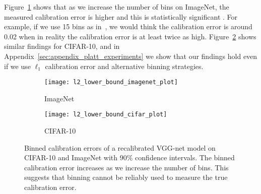 Figure~\ref{fig:imagenet_lower_bound} shows that as we increase the number of bins on ImageNet, the measured calibration error is higher and this is statistically significant . For example, if we use 15 bins as in~\cite{guo2017calibration}, we would think the calibration error is around 0.02 when in reality the calibration error is at least twice as high. Figure~\ref{fig:cifar_10_lower_bound} shows similar findings for CIFAR-10, and in Appendix~\ref{sec:appendix_platt_experiments} we show that our findings hold even if we use $\ell_1$ calibration error and alternative binning strategies.

\begin{figure}
     \centering
     \begin{subfigure}[b]{0.4\textwidth}
         \centering
         \texttt{[image: l2\_lower\_bound\_imagenet\_plot]}
         \caption{ImageNet}
         \label{fig:imagenet_lower_bound}
     \end{subfigure}
     \hfill
     \begin{subfigure}[b]{0.4\textwidth}
         \centering
         \texttt{[image: l2\_lower\_bound\_cifar\_plot]}
         \caption{CIFAR-10}
         \label{fig:cifar_10_lower_bound}
     \end{subfigure}
        \caption{
          Binned calibration errors of a recalibrated VGG-net model on CIFAR-10 and ImageNet  with $90\%$ confidence intervals. The binned calibration error increases as we increase the number of bins. This suggests that binning cannot be reliably used to measure the true calibration error.
        }
        \label{fig:lower_bounds}
\end{figure}





